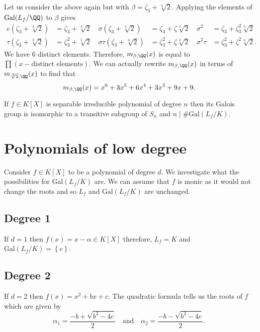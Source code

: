 \documentclass[12pt, a4paper]{article}
\newcommand{\gal}{\text{Gal}}
\begin{document}
\begin{example}
    Let us consider the above again but with \(\beta = \zeta_3+\sqrt[3]{2}\). Applying the elements of \(\gal(L_f/\QQ)\) to \(\beta\) gives
    \[\begin{aligned}
        e(\zeta_3+\sqrt[3]{2})&=\zeta_3+\sqrt[3]{2} \quad \sigma(\zeta_3+\sqrt[3]{2})&=\zeta_3+\zeta\sqrt[3]{2} \quad \sigma^2&= \zeta_3+\zeta_3^2\sqrt[3]{2} \\
        \tau(\zeta_3+\sqrt[3]{2}) &= \zeta_3^2+\sqrt[3]{2} \quad \sigma\tau(\zeta_3+\sqrt[3]{2})&= \zeta_3^2+\zeta\sqrt[3]{2} \quad \sigma^2\tau &= \zeta_3^2+\zeta^2\sqrt[3]{2}.
    \end{aligned}\]
    We have 6 distinct elements. 
    Therefore, \(m_{\beta,\QQ}(x)\) is equal to \(\prod (x-\text{distinct elements})\). We can actually rewrite \(m_{\beta,\QQ}(x)\) in terms of \(m_{\sqrt[3]{2},\QQ}(x)\) to find that 
    \[m_{\beta,\QQ}(x)= x^6+3x^5+6x^4+3x^3+9x+9.\]
\end{example}

\begin{mdprop}
    If \(f\in K[X]\) is separable irreducible polynomial of degree \(n\) then its Galois group is isomorphic to a transitive subgroup of \(S_n\) and \(n \mid \#\gal(L_f/K)\). 
\end{mdprop}


\section{Polynomials of low degree}

Consider \(f\in K[X]\) to be a polynomial of degree \(d\). We investigate what the possibilities for \(\gal(L_f/K)\) are. We can assume that \(f\) is monic as it would not change the roots and so \(L_f\) and \(\gal(L_f/K)\) are unchanged.

\subsection{Degree 1}

If \(d=1\) then \(f(x)=x-\alpha \in K[X]\) therefore, \(L_f=K\) and \(\gal(L_f/K)=\left\{ e \right\}\).

\subsection{Degree 2}

If \(d=2\) then \(f(x)=x^2+bx+c\). The quadratic formula tells us the roots of \(f\) which are given by 
\[\alpha_1= \frac{-b+\sqrt{b^2-4c}}{2} \quad\text{and} \quad\alpha_2 =\frac{-b-\sqrt{b^2-4c}}{2}. \]
\end{document}

